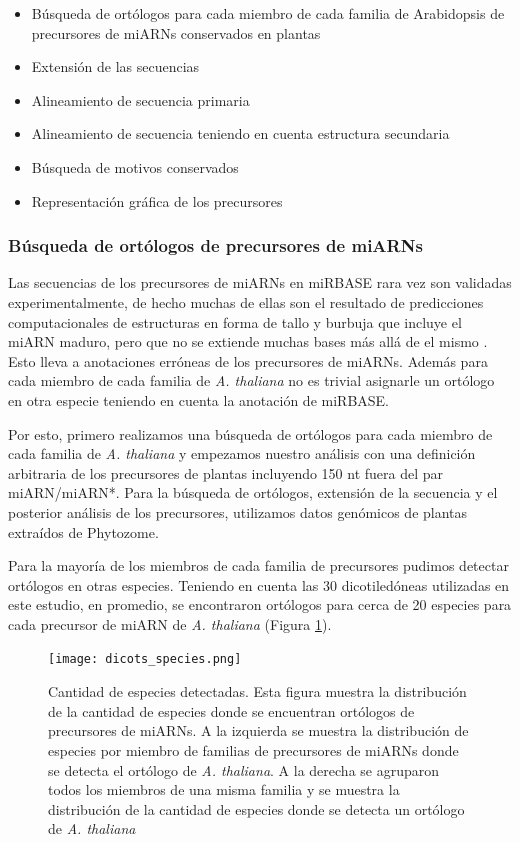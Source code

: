 \begin{itemize}
    \item Búsqueda de ortólogos para cada miembro de cada familia de Arabidopsis de  precursores de miARNs conservados en plantas
    \item Extensión de las secuencias
    \item Alineamiento de secuencia primaria
    \item Alineamiento de secuencia teniendo en cuenta estructura secundaria
    \item Búsqueda de motivos conservados
    \item Representación gráfica de los precursores
\end{itemize}

\subsubsection{Búsqueda de ortólogos de precursores de miARNs}

Las secuencias de los precursores de miARNs en miRBASE rara vez son validadas experimentalmente, de hecho muchas de ellas son el resultado de predicciones computacionales de estructuras en forma de tallo y burbuja que incluye el miARN maduro, pero que no se extiende muchas bases más allá de el mismo \cite{Kozomara2014}.
Esto lleva a anotaciones erróneas de los precursores de miARNs.
Además para cada miembro de cada familia de \textit{A. thaliana} no es trivial asignarle un ortólogo en otra especie teniendo en cuenta la anotación de miRBASE.

Por esto, primero realizamos una búsqueda de ortólogos para cada miembro de cada familia de \textit{A. thaliana} y empezamos nuestro análisis con una definición arbitraria de los precursores de plantas incluyendo 150 nt fuera del par miARN/miARN*.
Para la búsqueda de ortólogos, extensión de la secuencia y el posterior análisis de los precursores, utilizamos datos genómicos de plantas extraídos de Phytozome. 

Para la mayoría de los miembros de cada familia de precursores pudimos detectar ortólogos en otras especies. 
Teniendo en cuenta las 30 dicotiledóneas utilizadas en este estudio, en promedio, se encontraron ortólogos para cerca de 20 especies para cada precursor de miARN de \textit{A. thaliana} (Figura \ref{fig:dicots_species}).

\begin{figure}[htbp!]
    \centering    
    \texttt{[image: dicots\_species.png]}
    \caption[Especies detectadas]{Cantidad de especies detectadas.
    Esta figura muestra la distribución de la cantidad de especies donde se encuentran ortólogos de precursores de miARNs.
    A la izquierda se muestra la distribución de especies por miembro de familias de precursores de miARNs donde se detecta el ortólogo de \textit{A. thaliana}.
    A la derecha se agruparon todos los miembros de una misma familia y se muestra la distribución de la cantidad de especies donde se detecta un ortólogo de \textit{A. thaliana}}
    \label{fig:dicots_species}
\end{figure}

